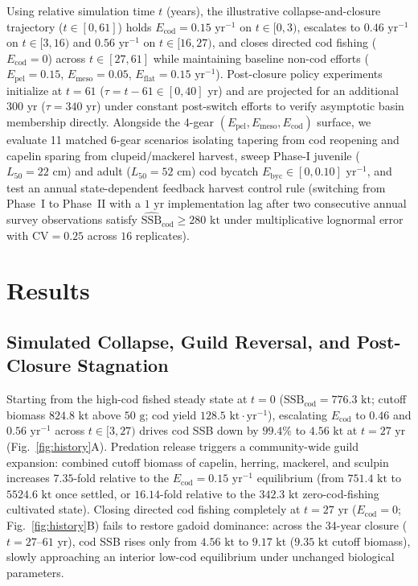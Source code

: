 \documentclass[11pt,letterpaper]{article}
\begin{document}
Using relative simulation time $t$ (years), the illustrative collapse-and-closure trajectory ($t \in [0, 61]$) holds $E_{\mathrm{cod}} = 0.15\text{ yr}^{-1}$ on $t \in [0, 3)$, escalates to $0.46\text{ yr}^{-1}$ on $t \in [3, 16)$ and $0.56\text{ yr}^{-1}$ on $t \in [16, 27)$, and closes directed cod fishing ($E_{\mathrm{cod}} = 0$) across $t \in [27, 61]$ while maintaining baseline non-cod efforts ($E_{\mathrm{pel}} = 0.15$, $E_{\mathrm{meso}} = 0.05$, $E_{\mathrm{flat}} = 0.15\text{ yr}^{-1}$). Post-closure policy experiments initialize at $t = 61$ ($\tau = t - 61 \in [0, 40]\text{ yr}$) and are projected for an additional $300\text{ yr}$ ($\tau = 340\text{ yr}$) under constant post-switch efforts to verify asymptotic basin membership directly. Alongside the 4-gear $(E_{\mathrm{pel}}, E_{\mathrm{meso}}, E_{\mathrm{cod}})$ surface, we evaluate 11 matched 6-gear scenarios isolating tapering from cod reopening and capelin sparing from clupeid/mackerel harvest, sweep Phase-I juvenile ($L_{50} = 22\text{ cm}$) and adult ($L_{50} = 52\text{ cm}$) cod bycatch $E_{\mathrm{byc}} \in [0, 0.10]\text{ yr}^{-1}$, and test an annual state-dependent feedback harvest control rule (switching from Phase~I to Phase~II with a $1\text{ yr}$ implementation lag after two consecutive annual survey observations satisfy $\widehat{\mathrm{SSB}}_{\mathrm{cod}} \ge 280\text{ kt}$ under multiplicative lognormal error with $\mathrm{CV} = 0.25$ across $16$ replicates).

\section{Results}

\subsection{Simulated Collapse, Guild Reversal, and Post-Closure Stagnation}

Starting from the high-cod fished steady state at $t = 0$ ($\mathrm{SSB}_{\mathrm{cod}} = 776.3\text{ kt}$; cutoff biomass $824.8\text{ kt}$ above $50\text{ g}$; cod yield $128.5\text{ kt}\cdot\text{yr}^{-1}$), escalating $E_{\mathrm{cod}}$ to $0.46$ and $0.56\text{ yr}^{-1}$ across $t \in [3, 27)$ drives cod SSB down by $99.4\%$ to $4.56\text{ kt}$ at $t = 27\text{ yr}$ (Fig.~\ref{fig:history}A). Predation release triggers a community-wide guild expansion: combined cutoff biomass of capelin, herring, mackerel, and sculpin increases $7.35$-fold relative to the $E_{\mathrm{cod}} = 0.15\text{ yr}^{-1}$ equilibrium (from $751.4\text{ kt}$ to $5524.6\text{ kt}$ once settled, or $16.14$-fold relative to the $342.3\text{ kt}$ zero-cod-fishing cultivated state). Closing directed cod fishing completely at $t = 27\text{ yr}$ ($E_{\mathrm{cod}} = 0$; Fig.~\ref{fig:history}B) fails to restore gadoid dominance: across the 34-year closure ($t = 27$--$61\text{ yr}$), cod SSB rises only from $4.56\text{ kt}$ to $9.17\text{ kt}$ ($9.35\text{ kt}$ cutoff biomass), slowly approaching an interior low-cod equilibrium under unchanged biological parameters.
\end{document}
